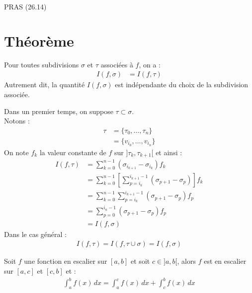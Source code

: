 \documentclass[../main.tex]{subfiles}
\begin{document}
\noindent PRAS (26.14)

\section{Théorème}
\begin{tcolorbox}[title=Théorème 26.17, title filled=false, colframe=orange, colback=orange!10!white]
    Pour toutes subdivisions $\sigma$ et $\tau$ associées à $f$, on a : 
    \begin{align*}
        I(f, \sigma) &= I(f, \tau)
    \end{align*}
    Autrement dit, la quantité $I(f, \sigma)$ est indépendante du choix de la subdivision associée. 
\end{tcolorbox}

\noindent Dans un premier temps, on suppose $\tau \subset \sigma$. \\
Notons : 
\begin{align*}
    \tau &= \{ \tau_0, \ldots, \tau_n \} \\
    &= \{ v_{i_0}, \ldots, v_{i_n} \}
\end{align*}
On note $f_k$ la valeur constante de $f$ sur $]\tau_k, \tau_{k+1}[$ et ainsi : 
\begin{align*}
    I(f, \tau) &= \sum_{k=0}^{n-1} (\sigma_{i_{k+1}} - \sigma_{i_k}) f_k \\
    &= \sum_{k=0}^{n-1} \left[ \sum_{p=i_k}^{i_{k+1} - 1} (\sigma_{p+1} - \sigma_p) \right] f_k \\
    &= \sum_{k=0}^{n-1} \sum_{p=i_k}^{i_{k+1} - 1} (\sigma_{p+1} - \sigma_p) f_p \\
    &= \sum_{p=0}^{i_n - 1} (\sigma_{p+1} - \sigma_p) f_p \\
    &= I(f, \sigma)
\end{align*}
Dans le cas général : 
\begin{align*}
    I(f, \tau) = I(f, \tau \cup \sigma) = I(f, \sigma)
\end{align*}

\begin{tcolorbox}[title=Propostion 26.21, title filled=false, colframe=lightblue, colback=lightblue!10!white]
    Soit $f$ une fonction en escalier sur $[a,b]$ et soit $c\in ]a, b[$, alors $f$ est en escalier sur $[a,c]$ et $[c,b]$ et : 
    \begin{align*}
        \int_{a}^{b} f(x) \,dx = \int_{a}^{c} f(x) \,dx + \int_{c}^{b} f(x) \,dx
    \end{align*}
\end{tcolorbox}
\end{document}
